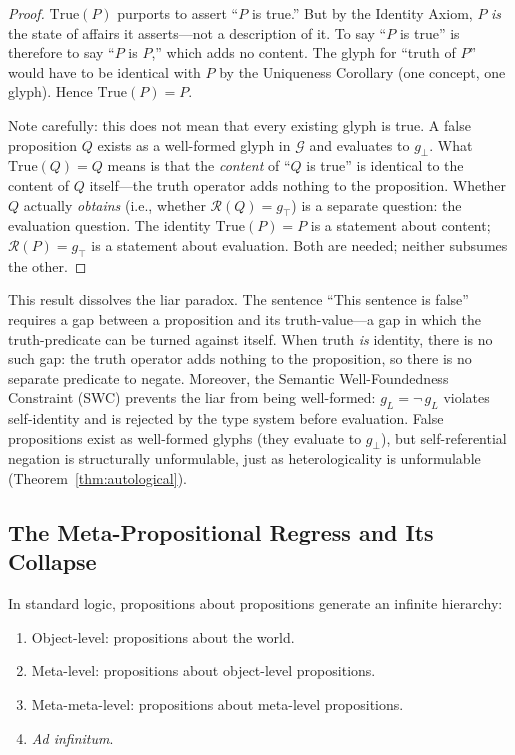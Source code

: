 \documentclass[12pt, letterpaper]{book}
\def\equiv{=}%
\def\mathfrak#1{#1}%
\begin{document}
\begin{proof}
$\mathrm{True}(P)$ purports to assert ``$P$ is true.'' But by the Identity Axiom, $P$ \textit{is} the state of affairs it asserts---not a description of it. To say ``$P$ is true'' is therefore to say ``$P$ is $P$,'' which adds no content. The glyph for ``truth of $P$'' would have to be identical with $P$ by the Uniqueness Corollary (one concept, one glyph). Hence $\mathrm{True}(P) \equiv P$.

Note carefully: this does not mean that every existing glyph is true. A false proposition $Q$ exists as a well-formed glyph in $\mathcal{G}$ and evaluates to $\mathfrak{g}_\bot$. What $\mathrm{True}(Q) \equiv Q$ means is that the \textit{content} of ``$Q$ is true'' is identical to the content of $Q$ itself---the truth operator adds nothing to the proposition. Whether $Q$ actually \textit{obtains} (i.e., whether $\mathcal{R}(Q) = \mathfrak{g}_\top$) is a separate question: the evaluation question. The identity $\mathrm{True}(P) \equiv P$ is a statement about content; $\mathcal{R}(P) = \mathfrak{g}_\top$ is a statement about evaluation. Both are needed; neither subsumes the other.
\end{proof}

This result dissolves the liar paradox. The sentence ``This sentence is false'' requires a gap between a proposition and its truth-value---a gap in which the truth-predicate can be turned against itself. When truth \textit{is} identity, there is no such gap: the truth operator adds nothing to the proposition, so there is no separate predicate to negate. Moreover, the Semantic Well-Foundedness Constraint (SWC) prevents the liar from being well-formed: $\mathfrak{g}_L \equiv \neg\, \mathfrak{g}_L$ violates self-identity and is rejected by the type system before evaluation. False propositions exist as well-formed glyphs (they evaluate to $\mathfrak{g}_\bot$), but self-referential negation is structurally unformulable, just as heterologicality is unformulable (Theorem~\ref{thm:autological}).

\subsection{The Meta-Propositional Regress and Its Collapse}

In standard logic, propositions about propositions generate an infinite hierarchy:

\begin{enumerate}[label=(\roman*)]
    \item Object-level: propositions about the world.
    \item Meta-level: propositions about object-level propositions.
    \item Meta-meta-level: propositions about meta-level propositions.
    \item \textit{Ad infinitum}.
\end{enumerate}
\end{document}
